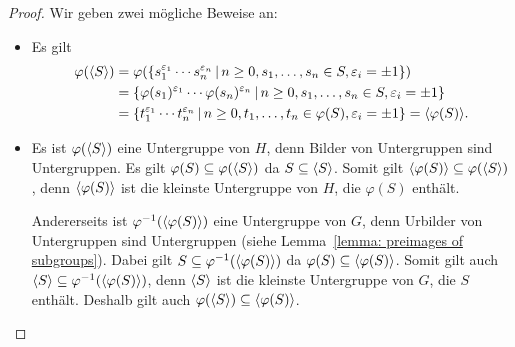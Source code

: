 \begin{proof}
  Wir geben zwei mögliche Beweise an:
  \begin{itemize}
    \item
      Es gilt
      \begin{align*}
            \varphi( \generated{S} )
        &=  \varphi(\{
                      s_1^{\varepsilon_1} \dotsm s_n^{\varepsilon_n}
                    \suchthat 
                      n \geq 0,
                      s_1, \dotsc, s_n \in S,
                      \varepsilon_i = \pm 1
                    \})
        \\
        &=  \{
              \varphi(s_1)^{\varepsilon_1} \dotsm \varphi(s_n)^{\varepsilon_n}
            \suchthat 
              n \geq 0,
              s_1, \dotsc, s_n \in S,
              \varepsilon_i = \pm 1
            \}
        \\
        &=  \{
              t_1^{\varepsilon_1} \dotsm t_n^{\varepsilon_n}
            \suchthat 
              n \geq 0,
              t_1, \dotsc, t_n \in \varphi(S),
              \varepsilon_i = \pm 1
            \}
        =  \generated{ \varphi(S) }.
      \end{align*}
      
    \item
      Es ist $\varphi(\langle S\rangle)$ eine Untergruppe von $H$, denn Bilder von Untergruppen sind Untergruppen.
      Es gilt $\varphi(S) \subseteq \varphi(\langle S\rangle)$ da $S \subseteq \langle S\rangle$.
      Somit gilt $\langle\varphi(S)\rangle \subseteq \varphi(\langle S\rangle)$, denn $\langle\varphi(S)\rangle$ ist die kleinste Untergruppe von $H$, die $\varphi(S)$ enthält.
      
      Andererseits ist $\varphi^{-1}(\langle\varphi(S)\rangle)$ eine Untergruppe von $G$, denn Urbilder von Untergruppen sind Untergruppen (siehe Lemma~\ref{lemma: preimages of subgroups}).
      Dabei gilt $S \subseteq \varphi^{-1}(\langle\varphi(S)\rangle)$ da $\varphi(S) \subseteq \langle\varphi(S)\rangle$.
      Somit gilt auch $\langle S\rangle \subseteq \varphi^{-1}(\langle\varphi(S)\rangle)$, denn $\langle S\rangle$ ist die kleinste Untergruppe von $G$, die $S$ enthält.
      Deshalb gilt auch $\varphi(\langle S\rangle) \subseteq \langle\varphi(S)\rangle$.
    \qedhere
  \end{itemize}
\end{proof}





\subsection{}

